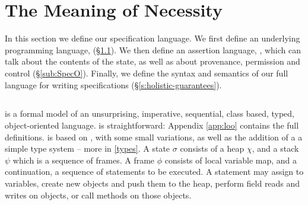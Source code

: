 \section{The Meaning of Necessity}
\label{s:semantics}

 
In this section we define our \Nec specification language.  We first
define an underlying programming language, \Loo (\S \ref{sub:Loo}).
We then define an assertion language, \SpecO, which can talk about the
contents of the state, as well as about provenance, permission and
control (\S \ref{sub:SpecO}).  Finally, we define the syntax and
semantics of our full language for writing \Nec
specifications (\S \ref{s:holistic-guarantees}).


\subsection{\Loo}
\label{sub:Loo} 
 \Loo is a formal model of an unsurprising, imperative, sequential, 
class based, typed, object-oriented language.
\Loo is straightforward:
Appendix \ref{app:loo} contains 
the full definitions.
\Loo is based on \LangOO 
\cite{FASE}, with some small variations, as well as 
the addition of a %
 a simple type system -- more in \ref{types}.
%
%
A \Loo state $\sigma$ consists of a 
heap $\chi$, and a  {stack $\psi$ which is a sequence of frames}.
A frame $\phi$ consists of
local variable map, and a continuation, \ie a sequence of statements to be executed.
 A statement may assign to variables, create new objects and push them to the heap, 
perform field reads and writes on objects,  or
 call methods on those objects. 

